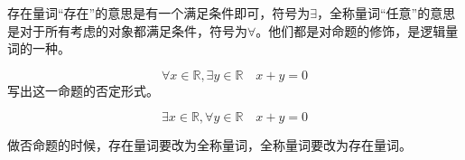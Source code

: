 \begin{definition}[存在和任意]
    存在量词“存在”的意思是有一个满足条件即可，符号为$\exists$，全称量词“任意”的意思是对于所有考虑的对象都满足条件，符号为$\forall$。他们都是对命题的修饰，是逻辑量词的一种。
\end{definition}

\begin{exercise}[逻辑量词的否定]
    $$\forall x \in \mathbb{R}, \exists y \in \mathbb{R} \quad x+y=0$$写出这一命题的否定形式。
\end{exercise}

\begin{solution}
    $$\exists x \in \mathbb{R}, \forall y \in \mathbb{R} \quad x+y=0$$

    做否命题的时候，存在量词要改为全称量词，全称量词要改为存在量词。
\end{solution}